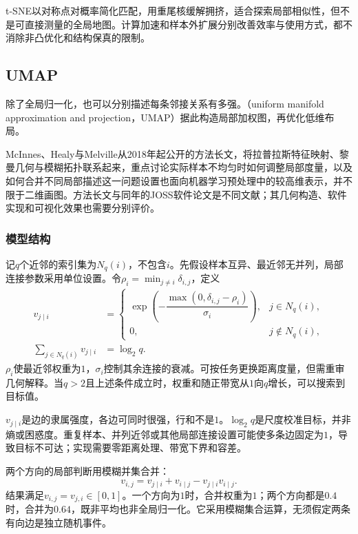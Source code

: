 t-SNE以对称点对概率简化匹配，用重尾核缓解拥挤，适合探索局部相似性，但不是可直接测量的全局地图。计算加速和样本外扩展分别改善效率与使用方式，都不消除非凸优化和结构保真的限制。

\subsection{UMAP}
\label{sec:dim-umap}

除了全局归一化，也可以分别描述每条邻接关系有多强。（uniform manifold approximation and projection，UMAP）据此构造局部加权图，再优化低维布局。

McInnes、Healy与Melville从2018年起公开的方法长文，将拉普拉斯特征映射、黎曼几何与模糊拓扑联系起来，重点讨论实际样本不均匀时如何调整局部度量，以及如何合并不同局部描述这一问题设置也面向机器学习预处理中的较高维表示，并不限于二维画图。方法长文与同年的JOSS软件论文是不同文献；其几何构造、软件实现和可视化效果也需要分别评价。

\subsubsection{模型结构}

记$q$个近邻的索引集为$N_q(i)$，不包含$i$。先假设样本互异、最近邻无并列，局部连接参数采用单位设置。令$\rho_i=\min_{j\ne i}\delta_{i,j}$，定义
\begin{equation}
  \label{eq:dim-umap-directed}
  \begin{aligned}
    v_{j\mid i}
      &=
      \begin{cases}
        \exp\!\left(-\dfrac{\max(0,\delta_{i,j}-\rho_i)}
        {\sigma_i}\right),&j\in N_q(i),\\
        0,&j\notin N_q(i),
      \end{cases}\\
    \sum_{j\in N_q(i)}v_{j\mid i}&=\log_2 q.
  \end{aligned}
\end{equation}
$\rho_i$使最近邻权重为$1$，$\sigma_i$控制其余连接的衰减。可按任务更换距离度量，但需重审几何解释。当$q>2$且上述条件成立时，权重和随正带宽从$1$向$q$增长，可以搜索到目标值。

$v_{j\mid i}$是边的隶属强度，各边可同时很强，行和不是$1$。$\log_2 q$是尺度校准目标，并非熵或困惑度。重复样本、并列近邻或其他局部连接设置可能使多条边固定为$1$，导致目标不可达；实现需要零距离处理、带宽下界和容差。

两个方向的局部判断用模糊并集合并：
\begin{equation}
  \label{eq:dim-umap-union}
  v_{i,j}=v_{j\mid i}+v_{i\mid j}-v_{j\mid i}v_{i\mid j}.
\end{equation}
结果满足$v_{i,j}=v_{j,i}\in[0,1]$。一个方向为$1$时，合并权重为$1$；两个方向都是$0.4$时，合并为$0.64$，既非平均也非全局归一化。它采用模糊集合运算，无须假定两条有向边是独立随机事件。

